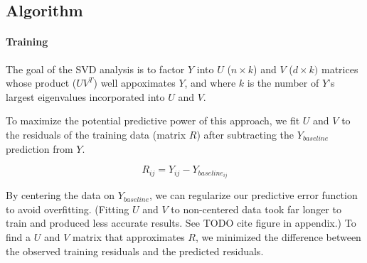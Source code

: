 \documentclass[12pt]{article}
\begin{document}

\subsection*{Algorithm}
\paragraph{Training} The goal of the SVD analysis is to factor $Y$ into $U$ ($n \times k$) and $V$ ($d \times k)$ matrices whose product ($U V^T$) well appoximates $Y$, and where $k$ is the number of $Y$'s largest eigenvalues incorporated into $U$ and $V$.

To maximize the potential predictive power of this approach, we fit $U$ and $V$ to the residuals of the training data (matrix $R$) after subtracting the $Y_{baseline}$ prediction from $Y$.

 $$ R_{ij} = Y_{ij} - Y_{baseline_{ij}} $$

 By centering the data on $Y_{baseline}$, we can regularize our predictive error function to avoid overfitting. (Fitting $U$ and $V$ to non-centered data took far longer to train and produced less accurate results. See TODO cite figure in appendix.) To find a $U$ and $V$ matrix that approximates $R$, we minimized the difference between the observed training residuals and the predicted residuals.
\end{document}
